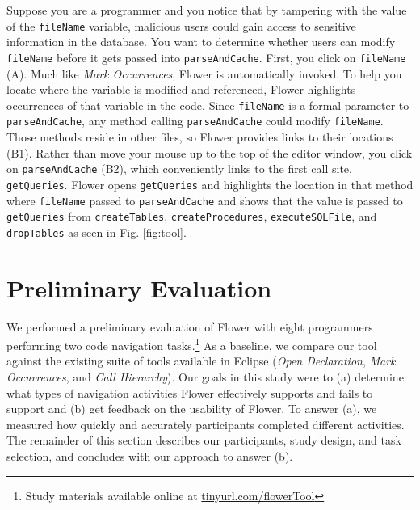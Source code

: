 \documentclass[conference]{IEEEtran}
\begin{document}
Suppose you are a programmer and you notice that by tampering with the value of the \texttt{fileName} variable, malicious users could gain access to sensitive information in the database. 
You want to determine whether users can modify \texttt{fileName} before it gets passed into \texttt{parseAndCache}. 
First, you click on \texttt{fileName} (A).
Much like \emph{Mark Occurrences}, Flower is automatically invoked.
To help you locate where the variable is modified and referenced, Flower highlights occurrences of that variable in the code.
Since \texttt{fileName} is a formal parameter to \texttt{parseAndCache}, any method calling \texttt{parseAndCache} could modify \texttt{fileName}. 
Those methods reside in other files, so Flower  provides links to their locations (B1).
Rather than move your mouse up to the top of the editor window, you click on \texttt{parseAndCache} (B2), which conveniently links to the first call site, \texttt{getQueries}. 
Flower  opens \texttt{getQueries} and highlights the location in that method where \texttt{fileName} passed to \texttt{parseAndCache} and shows that the value is passed to \texttt{getQueries} from \texttt{createTables}, \texttt{createProcedures}, \texttt{executeSQLFile}, and \texttt{dropTables} as seen in Fig. \ref{fig:tool}.  



\section{Preliminary Evaluation}
We performed a preliminary evaluation of Flower with eight programmers performing two code navigation tasks.\footnote{Study materials available online at \url{tinyurl.com/flowerTool}}
As a baseline, we compare our tool against the existing suite of tools available in Eclipse (\emph{Open Declaration}, \emph{Mark Occurrences}, and \emph{Call Hierarchy}).
Our goals in this study were to (a) determine what types of navigation activities Flower  effectively supports and fails to support and (b) get feedback on the usability of Flower.
To answer (a), we measured how quickly and accurately participants completed different activities.
The remainder of this section describes our participants, study design, and task selection, and concludes with our approach to answer (b).
\end{document}
